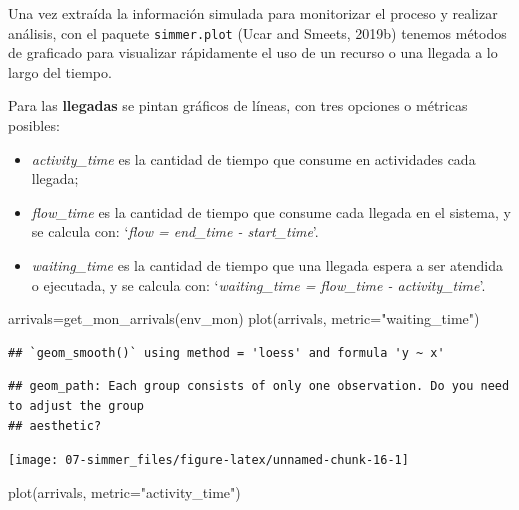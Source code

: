 \documentclass[
]{book}
\newenvironment{Shaded}{\begin{snugshade}}{\end{snugshade}}
\newcommand{\AttributeTok}[1]{\textcolor[rgb]{0.77,0.63,0.00}{#1}}
\newcommand{\FunctionTok}[1]{\textcolor[rgb]{0.00,0.00,0.00}{#1}}
\newcommand{\NormalTok}[1]{#1}
\newcommand{\OtherTok}[1]{\textcolor[rgb]{0.56,0.35,0.01}{#1}}
\newcommand{\StringTok}[1]{\textcolor[rgb]{0.31,0.60,0.02}{#1}}
\providecommand{\tightlist}{%
  \setlength{\itemsep}{0pt}\setlength{\parskip}{0pt}}
\theoremstyle{definition}
\theoremstyle{definition}
\theoremstyle{definition}
\theoremstyle{definition}
\theoremstyle{remark}
\begin{document}
Una vez extraída la información simulada para monitorizar el proceso y realizar análisis, con el paquete \texttt{simmer.plot} (Ucar and Smeets, 2019b) tenemos métodos de graficado para visualizar rápidamente el uso de un recurso o una llegada a lo largo del tiempo.

Para las \textbf{llegadas} se pintan gráficos de líneas, con tres opciones o métricas posibles:

\begin{itemize}
\tightlist
\item
  \emph{activity\_time} es la cantidad de tiempo que consume en actividades cada llegada;
\item
  \emph{flow\_time} es la cantidad de tiempo que consume cada llegada en el sistema, y se calcula con: `\emph{flow = end\_time - start\_time}'.
\item
  \emph{waiting\_time} es la cantidad de tiempo que una llegada espera a ser atendida o ejecutada, y se calcula con: `\emph{waiting\_time = flow\_time - activity\_time}'.
\end{itemize}

\begin{Shaded}
\begin{Highlighting}[]
\NormalTok{arrivals}\OtherTok{=}\FunctionTok{get\_mon\_arrivals}\NormalTok{(env\_mon)}
\FunctionTok{plot}\NormalTok{(arrivals, }\AttributeTok{metric=}\StringTok{"waiting\_time"}\NormalTok{)}
\end{Highlighting}
\end{Shaded}

\begin{verbatim}
## `geom_smooth()` using method = 'loess' and formula 'y ~ x'
\end{verbatim}

\begin{verbatim}
## geom_path: Each group consists of only one observation. Do you need to adjust the group
## aesthetic?
\end{verbatim}

\begin{center}\texttt{[image: 07-simmer\_files/figure-latex/unnamed-chunk-16-1]} \end{center}

\begin{Shaded}
\begin{Highlighting}[]
\FunctionTok{plot}\NormalTok{(arrivals, }\AttributeTok{metric=}\StringTok{"activity\_time"}\NormalTok{)}
\end{Highlighting}
\end{Shaded}
\end{document}

